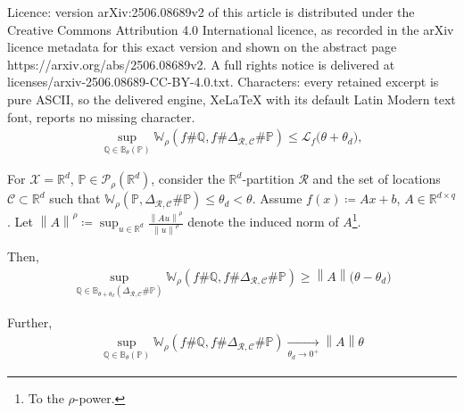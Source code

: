 \documentclass[10pt,a4paper]{amsart}
\def\bsC{{\bm{\mathcal{C}}}}
\def\bsR{{\bm{\mathcal{R}}}}
\def\probQ{\mathbb{Q}}
\def\prob{\mathbb{P}}
\def\realNum{{\mathbb{R}}}
\def\sL{{\mathcal{L}}}
\def\sP{{\mathcal{P}}}
\def\sX{{\mathcal{X}}}
\def\wasserstein{{\mathbb{W}}}
\newcommand{\norm}[1]{\left\lVert#1\right\rVert}
\begin{document}
Licence: version arXiv:2506.08689v2 of this article is distributed under the Creative Commons Attribution 4.0 International licence, as recorded in the arXiv licence metadata for this exact version and shown on the abstract page https://arxiv.org/abs/2506.08689v2. A full rights notice is delivered at licenses/arxiv-2506.08689-CC-BY-4.0.txt. Characters: every retained excerpt is pure ASCII, so the delivered engine, XeLaTeX with its default Latin Modern text font, reports no missing character.
\begin{align}
    \label{eq:LipschitzBound}
   \sup_{\probQ \in \mathbb{B}_\theta(\prob)} \wasserstein_\rho(f\#\probQ, f\#\Delta_{\bsR, \bsC}\#\prob) \leq \sL_f \big( \theta+\theta_d \big),
\end{align}

    \begin{proposition}\label{prop:remark-linear-case}
        For $\sX = \realNum^d$, $\prob \in \sP_\rho(\realNum^d)$, consider the $\realNum^d$-partition $\bsR$ and the set of locations $\bsC \subset \realNum^d$ such that $\wasserstein_\rho(\prob, \Delta_{\bsR, \bsC}\#\prob) \leq \theta_d < \theta$.  Assume $f(x) \coloneqq Ax + b$, $A \in \realNum^{d \times q}$. Let $\norm{A}^\rho \coloneqq \sup_{u \in \realNum^d} \frac{\norm{Au}^\rho}{\norm{u}^\rho}$ denote the induced norm of $A$\footnote{To the $\rho$-power.}.
    
    Then,
        \begin{align*}
            \sup_{\probQ \in \mathbb{B}_{\theta+\theta_d}(\Delta_{\bsR, \bsC}\#\prob)} \wasserstein_\rho(f\#\probQ, f\#\Delta_{\bsR, \bsC}\#\prob) \geq \norm{A} \big( \theta-\theta_d \big)
        \end{align*}
    
    Further,
        \begin{align*}
            \sup_{\probQ \in \mathbb{B}_{\theta}(\prob)} \wasserstein_\rho(f \# \probQ, f \# \Delta_{\bsR, \bsC}\#\prob) \xrightarrow[\theta_d \to 0^+]{} \norm{A} \theta
        \end{align*}
    \end{proposition}
\end{document}
